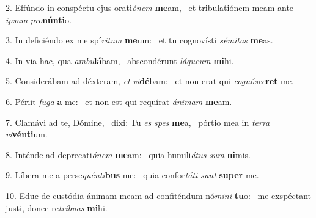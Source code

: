 2. Effúndo in conspéctu ejus orati\textit{ó}\textit{nem} \textbf{me}am, \ast\  et tribulatiónem meam ante \textit{ip}\textit{sum} \textit{pro}\textbf{nún}\textbf{ti}o.\

3. In deficiéndo ex me spí\textit{ri}\textit{tum} \textbf{me}um: \ast\  et tu cognovísti \textit{sé}\textit{mi}\textit{tas} \textbf{me}as.\

4. In via hac, qua \textit{am}\textit{bu}\textbf{lá}bam, \ast\  abscondérunt \textit{lá}\textit{que}\textit{um} \textbf{mi}hi.\

5. Considerábam ad déxteram, \textit{et} \textit{vi}\textbf{dé}bam: \ast\  et non erat qui \textit{co}\textit{gnó}\textit{sce}\textbf{ret} me.\

6. Périit \textit{fu}\textit{ga} \textbf{a} me: \ast\  et non est qui requírat \textit{á}\textit{ni}\textit{mam} \textbf{me}am.\

7. Clamávi ad te, Dómine, \dag\  dixi: Tu \textit{es} \textit{spes} \textbf{me}a, \ast\  pórtio mea in \textit{ter}\textit{ra} \textit{vi}\textbf{vén}\textbf{ti}um.\

8. Inténde ad deprecati\textit{ó}\textit{nem} \textbf{me}am: \ast\  quia humili\textit{á}\textit{tus} \textit{sum} \textbf{ni}mis.\

9. Líbera me a perse\textit{quén}\textit{ti}\textbf{bus} me: \ast\  quia confor\textit{tá}\textit{ti} \textit{sunt} \textbf{su}\textbf{per} me.\

10. Educ de custódia ánimam meam ad confiténdum nó\textit{mi}\textit{ni} \textbf{tu}o: \ast\  me exspéctant justi, donec re\textit{trí}\textit{bu}\textit{as} \textbf{mi}hi.\


